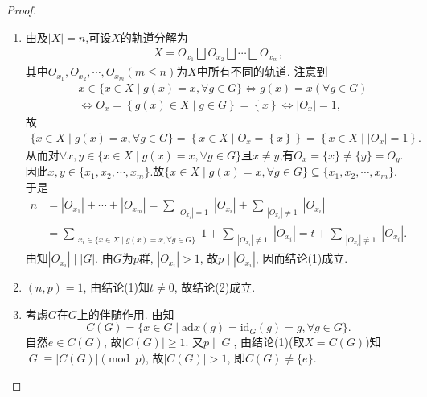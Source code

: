 \documentclass[../../main.tex]{subfiles}%
\begin{document}
\begin{proof}
\begin{enumerate}[(1)]
\item 由及$|X|=n$,可设$X$的轨道分解为
\begin{align*}
X=O_{x_1}\bigsqcup O_{x_2}\bigsqcup\cdots\bigsqcup O_{x_m},
\end{align*}
其中$O_{x_1},O_{x_2},\cdots,O_{x_m}(m\leqslant n)$为$X$中所有不同的轨道.
注意到
\begin{align*}
&x\in \{x\in X\mid g(x)=x,\forall g\in G\}\Longleftrightarrow g(x)=x(\forall g\in G)
\\
&\Longleftrightarrow O_x=\left\{ g\left( x \right) \in X\mid g\in G \right\} =\left\{ x \right\} \Longleftrightarrow |O_x|=1,
\end{align*}
故
\begin{align}\label{eq::98h20jf30tuj3pg34}
\{x\in X\mid g(x)=x,\forall g\in G\}=\left\{ x\in X\mid O_x=\left\{ x \right\} \right\} =\left\{ x\in X\mid |O_x|=1 \right\}.
\end{align}
从而对$\forall x,y\in \{x\in X\mid g(x)=x,\forall g\in G\}$且$x\ne y$,有$O_x=\{x\}\ne \{y\}=O_y$.因此$x,y\in \{x_1,x_2,\cdots ,x_m\}$.故$\{x\in X\mid g(x)=x,\forall g\in G\}\subseteq \{x_1,x_2,\cdots ,x_m\}$.
于是
\begin{align*}
n&=\left| O_{x_1} \right|+\cdots +\left| O_{x_m} \right|=\sum_{\substack{|O_{x_i}|= 1}} |O_{x_i}|+\sum_{\substack{|O_{x_i}|\neq 1}} |O_{x_i}|
\\
&=\sum_{\substack{x_i\in \{x\in X\mid g(x)=x,\forall g\in G\}}} 1+\sum_{\substack{|O_{x_i}|\neq 1}} |O_{x_i}|=t+\sum_{\substack{|O_{x_i}|\neq 1}} |O_{x_i}|.
\end{align*}
由知$|O_{x_i}|\mid |G|$. 由$G$为$p$群, $|O_{x_i}|>1$, 故$p\mid |O_{x_i}|$, 因而结论(1)成立.
\item $(n,p)=1$, 由结论(1)知$t\neq 0$, 故结论(2)成立.
\item 考虑$G$在$G$上的伴随作用. 由知
$$
C(G)=\{x\in G\mid \mathrm{ad}x\left( g \right) =\mathrm{id}_G\left( g \right)=g ,\forall g\in G\}.
$$
自然$e\in C(G)$, 故$|C(G)|\geqslant 1$. 又$p\mid |G|$, 由结论(1)(取$X=C(G)$)知$|G|\equiv |C(G)|\pmod{p}$, 故$|C(G)|>1$, 即$C(G)\neq \{e\}$.
\end{enumerate}

\end{proof}
\end{document}
